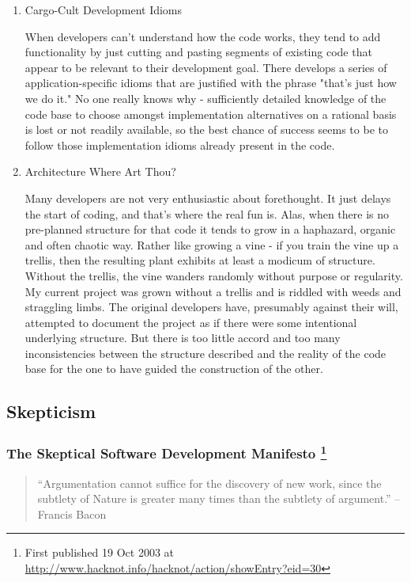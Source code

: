 \documentclass{article}
\begin{document}
\begin{enumerate}
\item Cargo-Cult Development Idioms
\label{sec:orgheadline342}

When developers can't understand how the code works, they tend to add
functionality by just cutting and pasting segments of existing code that
appear to be relevant to their development goal. There develops a series
of application-specific idioms that are justified with the phrase
"that's just how we do it." No one really knows why - sufficiently
detailed knowledge of the code base to choose amongst implementation
alternatives on a rational basis is lost or not readily available, so
the best chance of success seems to be to follow those implementation
idioms already present in the code.

\item Architecture Where Art Thou?
\label{sec:orgheadline343}

Many developers are not very enthusiastic about forethought. It just
delays the start of coding, and that's where the real fun is. Alas, when
there is no pre-planned structure for that code it tends to grow in a
haphazard, organic and often chaotic way. Rather like growing a vine -
if you train the vine up a trellis, then the resulting plant exhibits at
least a modicum of structure. Without the trellis, the vine wanders
randomly without purpose or regularity. My current project was grown
without a trellis and is riddled with weeds and straggling limbs. The
original developers have, presumably against their will, attempted to
document the project as if there were some intentional underlying
structure. But there is too little accord and too many inconsistencies
between the structure described and the reality of the code base for the
one to have guided the construction of the other.
\end{enumerate}

\subsection{Skepticism}
\label{sec:orgheadline404}

\subsubsection{The Skeptical Software Development Manifesto \footnote{First published 19 Oct 2003 at
\url{http://www.hacknot.info/hacknot/action/showEntry?eid=30}}}
\label{sec:orgheadline360}

\begin{quote}
“Argumentation cannot suffice for the discovery of new work, since the
subtlety of Nature is greater many times than the subtlety of
argument.” -- Francis Bacon
\end{quote}
\end{document}

